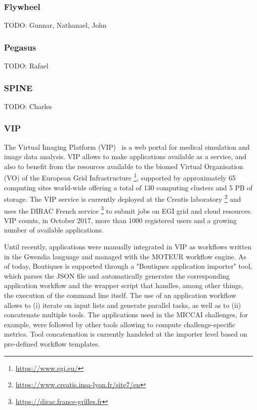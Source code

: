 \documentclass{article}
\newcommand{\todo}[1]{\color{red}TODO: #1\color{black}}
\begin{document}
\subsubsection{Flywheel}
\todo{Gunnar, Nathanael, John}

\subsubsection{Pegasus}
\todo{Rafael}

\subsubsection{SPINE}
\todo{Charles}

\subsubsection{VIP}

The Virtual Imaging Platform (VIP)~\cite{GLAT-13} is a web portal for medical 
simulation  and image data analysis. VIP allows to make applications 
available as a service, and also to benefit from the resources available 
to the biomed Virtual Organisation (VO) of the European Grid Infrastructure 
\footnote{\url{https://www.egi.eu/}}, supported by approximately 65 computing
sites world-wide offering a total of 130 computing clusters and 5 PB of storage.
The VIP service is currently deployed at the Creatis laboratory
\footnote{\url{https://www.creatis.insa-lyon.fr/site7/en}} and uses the DIRAC 
French service \footnote{\url{https://dirac.france-grilles.fr}} to submit jobs on 
EGI grid and cloud resources.  VIP counts, in October 2017, more than 1000 
registered users and a growing number of available applications.

Until recently, applications were manually integrated in VIP as workflows written 
in the Gwendia\cite{MONT-09} language and managed  with the MOTEUR\cite{GLAT-08} workflow engine. 
As of today, Boutiques is supported through a "Boutiques application importer" tool, which 
parses the JSON file and automatically generates the corresponding application workflow
and the wrapper script that handles, among other things, the execution of the command line itself. 
The use of an application workflow allows to (i) iterate on input lists and generate 
parallel tasks, as well as to (ii) concatenate multiple tools. The applications used in 
the MICCAI challenges, for example, were followed by other tools allowing to compute 
challenge-specific metrics. Tool concatenation is currently handeled at the importer 
level based on pre-defined workflow templates. 
\end{document}

